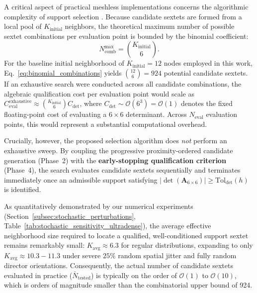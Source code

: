 \documentclass[preprint,12pt]{elsarticle}
\begin{document}
A critical aspect of practical meshless implementations concerns the algorithmic complexity of support selection \cite{slak2018refined}. Because candidate sextets are formed from a local pool of $K_{\mathrm{initial}}$ neighbors, the theoretical maximum number of possible sextet combinations per evaluation point is bounded by the binomial coefficient:
\begin{equation}
N_{\mathrm{comb}}^{\mathrm{max}} = \binom{K_{\mathrm{initial}}}{6}.
\label{eq:binomial_combinations}
\end{equation}
For the baseline initial neighborhood of $K_{\mathrm{initial}} = 12$ nodes employed in this work, Eq.~\eqref{eq:binomial_combinations} yields $\binom{12}{6} = 924$ potential candidate sextets. If an exhaustive search were conducted across all candidate combinations, the algebraic qualification cost per evaluation point would scale as $C_{\mathrm{eval}}^{\mathrm{exhaustive}} \approx \binom{K_{\mathrm{initial}}}{6} C_{\det}$, where $C_{\det} \sim \mathcal{O}(6^3) = \mathcal{O}(1)$ denotes the fixed floating-point cost of evaluating a $6 \times 6$ determinant. Across $N_{\mathrm{eval}}$ evaluation points, this would represent a substantial computational overhead.

Crucially, however, the proposed selection algorithm does \emph{not} perform an exhaustive sweep. By coupling the progressive proximity-ordered candidate generation (Phase~2) with the \textbf{early-stopping qualification criterion} (Phase~4), the search evaluates candidate sextets sequentially and terminates immediately once an admissible support satisfying $|\det(\mathbf{A}_{6 \times 6})| \ge \mathrm{Tol}_{\mathrm{det}}(h)$ is identified. 

As quantitatively demonstrated by our numerical experiments (Section~\ref{subsec:stochastic_perturbations}, Table~\ref{tab:stochastic_sensitivity_ultradense}), the average effective neighborhood size required to locate a qualified, well-conditioned support sextet remains remarkably small: $K_{\mathrm{avg}} \approx 6.3$ for regular distributions, expanding to only $K_{\mathrm{avg}} \approx 10.3 - 11.3$ under severe $25\%$ random spatial jitter and fully random director orientations. Consequently, the actual number of candidate sextets evaluated in practice ($\bar{N}_{\mathrm{tested}}$) is typically on the order of $\mathcal{O}(1)$ to $\mathcal{O}(10)$, which is orders of magnitude smaller than the combinatorial upper bound of 924.
\end{document}
